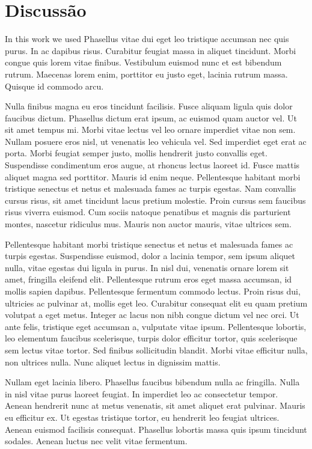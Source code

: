\chapter*{Discussão}

In this work we used Phasellus vitae dui eget leo tristique accumsan
nec quis purus. In ac dapibus risus. Curabitur feugiat massa in
aliquet tincidunt. Morbi congue quis lorem vitae finibus. Vestibulum
euismod nunc et est bibendum rutrum. Maecenas lorem enim, porttitor eu
justo eget, lacinia rutrum massa. Quisque id commodo arcu. 

Nulla finibus magna eu eros tincidunt facilisis. Fusce aliquam ligula
quis dolor faucibus dictum. Phasellus dictum erat ipsum, ac euismod
quam auctor vel. Ut sit amet tempus mi. Morbi vitae lectus vel leo
ornare imperdiet vitae non sem. Nullam posuere eros nisl, ut venenatis
leo vehicula vel. Sed imperdiet eget erat ac porta. Morbi feugiat
semper justo, mollis hendrerit justo convallis eget. Suspendisse
condimentum eros augue, at rhoncus lectus laoreet id. Fusce mattis
aliquet magna sed porttitor. Mauris id enim neque. Pellentesque
habitant morbi tristique senectus et netus et malesuada fames ac
turpis egestas. Nam convallis cursus risus, sit amet tincidunt lacus
pretium molestie. Proin cursus sem faucibus risus viverra euismod. Cum
sociis natoque penatibus et magnis dis parturient montes, nascetur
ridiculus mus. Mauris non auctor mauris, vitae ultrices sem. 

Pellentesque habitant morbi tristique senectus et netus et malesuada
fames ac turpis egestas. Suspendisse euismod, dolor a lacinia tempor,
sem ipsum aliquet nulla, vitae egestas dui ligula in purus. In nisl
dui, venenatis ornare lorem sit amet, fringilla eleifend elit.
Pellentesque rutrum eros eget massa accumsan, id mollis sapien
dapibus. Pellentesque fermentum commodo lectus. Proin risus dui,
ultricies ac pulvinar at, mollis eget leo. Curabitur consequat elit eu
quam pretium volutpat a eget metus. Integer ac lacus non nibh congue
dictum vel nec orci. Ut ante felis, tristique eget accumsan a,
vulputate vitae ipsum. Pellentesque lobortis, leo elementum faucibus
scelerisque, turpis dolor efficitur tortor, quis scelerisque sem
lectus vitae tortor. Sed finibus sollicitudin blandit. Morbi vitae
efficitur nulla, non ultrices nulla. Nunc aliquet lectus in dignissim
mattis. 

Nullam eget lacinia libero. Phasellus faucibus bibendum nulla ac
fringilla. Nulla in nisl vitae purus laoreet feugiat. In imperdiet leo
ac consectetur tempor. Aenean hendrerit nunc at metus venenatis, sit
amet aliquet erat pulvinar. Mauris eu efficitur ex. Ut egestas
tristique tortor, eu hendrerit leo feugiat ultrices. Aenean euismod
facilisis consequat. Phasellus lobortis massa quis ipsum tincidunt
sodales. Aenean luctus nec velit vitae fermentum. 

